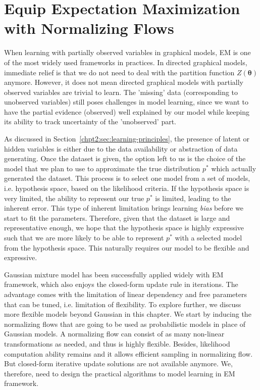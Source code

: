 \chapter{Equip Expectation Maximization with Normalizing Flows}
\label{chpt6:em-flow}
\graphicspath{{source/chapter6/}}

When learning with partially observed variables in graphical models, EM is one of the most widely used frameworks in practices. In directed graphical models, immediate relief is that we do not need to deal with the partition function $Z(\bm{\theta})$ anymore. However, it does not mean directed graphical models with partially observed variables are trivial to learn. The 'missing' data (corresponding to unobserved variables) still poses challenges in model learning, since we want to have the partial evidence (observed) well explained by our model while keeping its ability to track uncertainty of the 'unobserved' part.

As discussed in Section~\ref{chpt2:sec:learning-principles}, the presence of latent or hidden variables is either due to the data availability or abstraction of data generating. Once the dataset is given, the option left to us is the choice of the model that we plan to use to approximate the true distribution $p^{\ast}$ which actually generated the dataset. This process is to select one model from a set of models, i.e. hypothesis space, based on the likelihood criteria. If the hypothesis space is very limited, the ability to represent our true $p^{\ast}$ is limited, leading to the inherent error. This type of inherent limitation brings learning \textit{bias} before we start to fit the parameters.
Therefore, given that the dataset is large and representative enough, we hope that the hypothesis space is highly expressive such that we are more likely to be able to represent $p^{\ast}$ with a selected model from the hypothesis space. This naturally requires our model to be flexible and expressive.

Gaussian mixture model has been successfully applied widely with EM framework, which also enjoys the closed-form update rule in iterations. The advantage comes with the limitation of linear dependency and free parameters that can be tuned, i.e. limitation of flexibility. To explore further, we discuss more flexible models beyond Gaussian in this chapter. We start by inducing the normalizing flows that are going to be used as probabilistic models in place of Gaussian models. A normalizing flow can consist of as many non-linear transformations as needed, and thus is highly flexible. Besides, likelihood computation ability remains and it allows efficient sampling in normalizing flow. But closed-form iterative update solutions are not available anymore. We, therefore, need to design the practical algorithms to model learning in EM framework.


